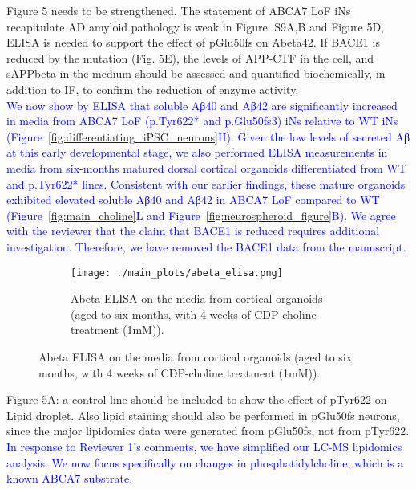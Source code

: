 Figure 5 needs to be strengthened. The statement of ABCA7 LoF iNs recapitulate AD amyloid pathology is weak in Figure. S9A,B and Figure 5D, ELISA is needed to support the effect of pGlu50fs on Abeta42. If BACE1 is reduced by the mutation (Fig. 5E), the levels of APP-CTF in the cell, and sAPPbeta in the medium should be assessed and quantified biochemically, in addition to IF, to confirm the reduction of enzyme activity.\\
\textcolor{blue}{We now show by ELISA that soluble Aβ40 and Aβ42 are significantly increased in media from ABCA7 LoF (p.Tyr622* and p.Glu50fs3) iNs relative to WT iNs (Figure~\ref{fig:differentiating_iPSC_neurons}H). Given the low levels of secreted Aβ at this early developmental stage, we also performed ELISA measurements in media from six-months matured dorsal cortical organoids differentiated from WT and p.Tyr622* lines. Consistent with our earlier findings, these mature organoids exhibited elevated soluble Aβ40 and Aβ42 in ABCA7 LoF compared to WT (Figure~\ref{fig:main_choline}L and Figure~\ref{fig:neurospheroid_figure}B). We agree with the reviewer that the claim that BACE1 is reduced requires additional investigation. Therefore, we have removed the BACE1 data from the manuscript.}

\begin{figure}[H] 
	\centering
	\begin{subfigure}[t]{.6\textwidth}
		\caption{Abeta ELISA on the media from cortical organoids (aged to six months, with 4 weeks of CDP-choline treatment (1mM)).}
		\texttt{[image: ./main\_plots/abeta\_elisa.png]}        
	\end{subfigure}  
\end{figure}

Figure 5A: a control line should be included to show the effect of pTyr622 on Lipid droplet. Also lipid staining should also be performed in pGlu50fs neurons, since the major lipidomics data were generated from pGlu50fs, not from pTyr622.\\
\textcolor{blue}{In response to Reviewer 1’s comments, we have simplified our LC-MS lipidomics analysis. We now focus specifically on changes in phosphatidylcholine, which is a known ABCA7 substrate.}

